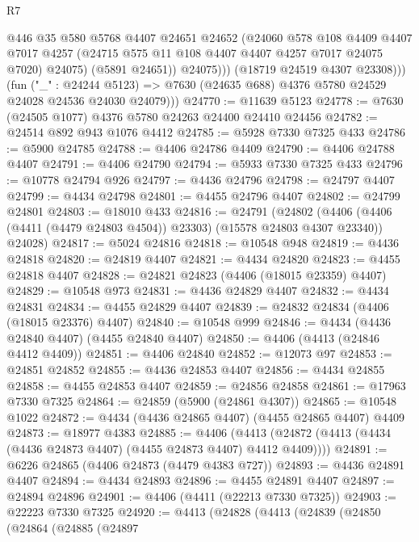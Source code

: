 \begin{lexlean}{R7}
\begin{coremodule}
                    @446
                    @35
                    @580
                    @5768
                    @4407
                    @24651
                    @24652
                    (@24060
                      @578
                      @108
                      @4409
                      @4407
                      @7017
                      @4257
                      (@24715 @575 @11 @108 @4407 @4407 @4257 @7017 @24075 @7020)
                      @24075)
                    (@5891 @24651))
                  @24075)))
            (@18719 @24519 @4307 @23308)))
        (fun ("_" : @24244 @5123) =>
        @7630 (@24635 @688) @4376 @5780 @24529 @24028 @24536 @24030 @24079)))
@24770 := @11639 @5123
@24778 := @7630 (@24505 @1077) @4376 @5780 @24263 @24400 @24410 @24456
@24782 := @24514 @892 @943 @1076 @4412
@24785 := @5928 @7330 @7325 @433
@24786 := @5900 @24785
@24788 := @4406 @24786 @4409
@24790 := @4406 @24788 @4407
@24791 := @4406 @24790
@24794 := @5933 @7330 @7325 @433
@24796 := @10778 @24794 @926
@24797 := @4436 @24796
@24798 := @24797 @4407
@24799 := @4434 @24798
@24801 := @4455 @24796 @4407
@24802 := @24799 @24801
@24803 := @18010 @433
@24816 := @24791
    (@24802 (@4406 (@4406 (@4411 (@4479 @24803 @4504)) @23303) (@15578 @24803 @4307 @23340)) @24028)
@24817 := @5024 @24816
@24818 := @10548 @948
@24819 := @4436 @24818
@24820 := @24819 @4407
@24821 := @4434 @24820
@24823 := @4455 @24818 @4407
@24828 := @24821 @24823 (@4406 (@18015 @23359) @4407)
@24829 := @10548 @973
@24831 := @4436 @24829 @4407
@24832 := @4434 @24831
@24834 := @4455 @24829 @4407
@24839 := @24832 @24834 (@4406 (@18015 @23376) @4407)
@24840 := @10548 @999
@24846 := @4434 (@4436 @24840 @4407) (@4455 @24840 @4407)
@24850 := @4406 (@4413 (@24846 @4412 @4409))
@24851 := @4406 @24840
@24852 := @12073 @97
@24853 := @24851 @24852
@24855 := @4436 @24853 @4407
@24856 := @4434 @24855
@24858 := @4455 @24853 @4407
@24859 := @24856 @24858
@24861 := @17963 @7330 @7325
@24864 := @24859 (@5900 (@24861 @4307))
@24865 := @10548 @1022
@24872 := @4434 (@4436 @24865 @4407) (@4455 @24865 @4407) @4409
@24873 := @18977 @4383
@24885 := @4406
    (@4413 (@24872 (@4413 (@4434 (@4436 @24873 @4407) (@4455 @24873 @4407) @4412 @4409))))
@24891 := @6226 @24865 (@4406 @24873 (@4479 @4383 @727))
@24893 := @4436 @24891 @4407
@24894 := @4434 @24893
@24896 := @4455 @24891 @4407
@24897 := @24894 @24896
@24901 := @4406 (@4411 (@22213 @7330 @7325))
@24903 := @22223 @7330 @7325
@24920 := @4413
    (@24828
      (@4413
        (@24839
          (@24850
            (@24864
              (@24885
                (@24897

\end{coremodule}
\end{lexlean}
